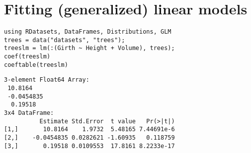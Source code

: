 \documentclass[11pt]{article}
\begin{document}
\section[Fitting (generalized) linear models]{Fitting (generalized) linear models}
\label{sec-6}

\begin{verbatim}
using RDatasets, DataFrames, Distributions, GLM
trees = data("datasets", "trees");
treeslm = lm(:(Girth ~ Height + Volume), trees);
coef(treeslm)
coeftable(treeslm)
\end{verbatim}

\begin{verbatim}
3-element Float64 Array:
 10.8164   
 -0.0454835
  0.19518
3x4 DataFrame:
          Estimate Std.Error  t value   Pr(>|t|)
[1,]       10.8164    1.9732  5.48165 7.44691e-6
[2,]    -0.0454835 0.0282621 -1.60935   0.118759
[3,]       0.19518 0.0109553  17.8161 8.2233e-17
\end{verbatim}
\end{document}
